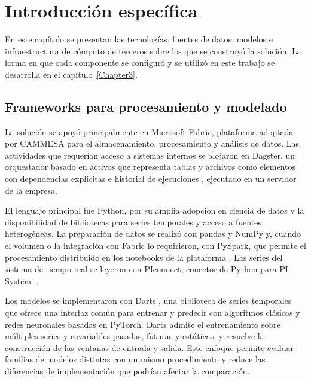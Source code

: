 \chapter{Introducción específica} %

\label{Chapter2}

En este capítulo se presentan las tecnologías, fuentes de datos, modelos e infraestructura de cómputo de terceros sobre los que se construyó la solución. La forma en que cada componente se configuró y se utilizó en este trabajo se desarrolla en el capítulo~\ref{Chapter3}.

\section{Frameworks para procesamiento y modelado}
\label{sec:frameworks_bibliotecas}

La solución se apoyó principalmente en Microsoft Fabric, plataforma adoptada por CAMMESA para el almacenamiento, procesamiento y análisis de datos. Las actividades que requerían acceso a sistemas internos se alojaron en Dagster, un orquestador basado en activos que representa tablas y archivos como elementos con dependencias explícitas e historial de ejecuciones \cite{dagsterOverview,dagsterAssets}, ejecutado en un servidor de la empresa.

El lenguaje principal fue Python, por su amplia adopción en ciencia de datos y la disponibilidad de bibliotecas para series temporales y acceso a fuentes heterogéneas. La preparación de datos se realizó con pandas y NumPy y, cuando el volumen o la integración con Fabric lo requirieron, con PySpark, que permite el procesamiento distribuido en los notebooks de la plataforma \cite{microsoftFabricNotebooks}. Las series del sistema de tiempo real se leyeron con PIconnect, conector de Python para PI System \cite{piconnectDocs}.

Los modelos se implementaron con Darts \cite{herzen2022darts}, una biblioteca de series temporales que ofrece una interfaz común para entrenar y predecir con algoritmos clásicos y redes neuronales basadas en PyTorch. Darts admite el entrenamiento sobre múltiples series y covariables pasadas, futuras y estáticas, y resuelve la construcción de las ventanas de entrada y salida. Este enfoque permite evaluar familias de modelos distintas con un mismo procedimiento y reduce las diferencias de implementación que podrían afectar la comparación.

